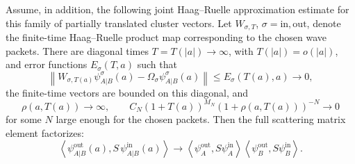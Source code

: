\begin{theorem}
Assume, in addition, the following joint Haag--Ruelle approximation estimate
for this family of partially translated cluster vectors.  Let
\(W_{\sigma,T}\), \(\sigma=\mathrm{in},\mathrm{out}\), denote the finite-time
Haag--Ruelle product map corresponding to the chosen wave packets.  There are
diagonal times \(T=T(|a|)\to\infty\), with \(T(|a|)=o(|a|)\), and error
functions \(E_\sigma(T,a)\) such that
\begin{equation}
  \left\|
    W_{\sigma,T(a)}\psi_{A|B}^{\sigma}(a)
    -
    \Omega_\sigma\psi_{A|B}^{\sigma}(a)
  \right\|
  \le
  E_\sigma(T(a),a)
  \longrightarrow0 ,
  \label{eq:joint-hr-cluster-approximation}
\end{equation}
the finite-time vectors are bounded on this diagonal, and
\begin{equation}
  \rho(a,T(a))\to\infty,\qquad
  C_N(1+T(a))^{M_N}(1+\rho(a,T(a)))^{-N}\to0
  \label{eq:cluster-diagonal-decay}
\end{equation}
for some \(N\) large enough for the chosen packets.  Then the full scattering
matrix element factorizes:
\[
  \left\langle
    \psi_{A|B}^{\mathrm{out}}(a),
    S\,
    \psi_{A|B}^{\mathrm{in}}(a)
  \right\rangle
  \longrightarrow
  \left\langle\psi_A^{\mathrm{out}},S\psi_A^{\mathrm{in}}\right\rangle
  \left\langle\psi_B^{\mathrm{out}},S\psi_B^{\mathrm{in}}\right\rangle .
\]
\end{theorem}

